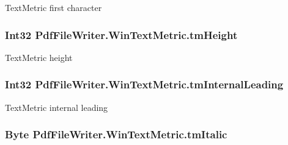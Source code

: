 Text\+Metric first character 

\subsubsection[{\texorpdfstring{tm\+Height}{tmHeight}}]{\setlength{\rightskip}{0pt plus 5cm}Int32 Pdf\+File\+Writer.\+Win\+Text\+Metric.\+tm\+Height\hspace{0.3cm}{\ttfamily [get]}}\hypertarget{class_pdf_file_writer_1_1_win_text_metric_a1c1e7fff0af44e242b4e9c3659ef2969}{}\label{class_pdf_file_writer_1_1_win_text_metric_a1c1e7fff0af44e242b4e9c3659ef2969}


Text\+Metric height 

\subsubsection[{\texorpdfstring{tm\+Internal\+Leading}{tmInternalLeading}}]{\setlength{\rightskip}{0pt plus 5cm}Int32 Pdf\+File\+Writer.\+Win\+Text\+Metric.\+tm\+Internal\+Leading\hspace{0.3cm}{\ttfamily [get]}}\hypertarget{class_pdf_file_writer_1_1_win_text_metric_a9685d19b3af05524b3a9505346e10986}{}\label{class_pdf_file_writer_1_1_win_text_metric_a9685d19b3af05524b3a9505346e10986}


Text\+Metric internal leading 

\subsubsection[{\texorpdfstring{tm\+Italic}{tmItalic}}]{\setlength{\rightskip}{0pt plus 5cm}Byte Pdf\+File\+Writer.\+Win\+Text\+Metric.\+tm\+Italic\hspace{0.3cm}{\ttfamily [get]}}\hypertarget{class_pdf_file_writer_1_1_win_text_metric_aee8ee8abafa96f22804ea7287cc40efb}{}\label{class_pdf_file_writer_1_1_win_text_metric_aee8ee8abafa96f22804ea7287cc40efb}


